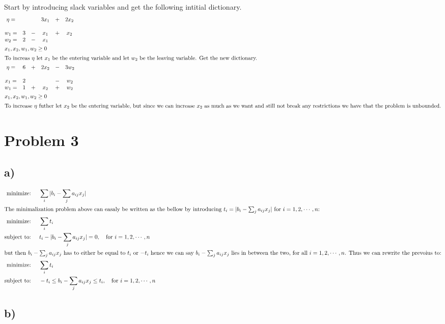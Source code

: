 \documentclass{article}
\begin{document}
Start by introducing slack variables and get the following intitial dictionary.
\begin{align*}
  &\begin{matrix}
     \eta = & & & 3x_1& + &2x_2 \\
     \\
     w_1 = & 3 & - & x_1& + &x_2  \\
     w_2 = & 2 & -&x_1 & & \\
   \end{matrix} \\
  &x_1, x_2, w_1, w_2 \geq 0 \\
  \intertext{To increas $\eta$ let $x_1$ be the entering variable and let $w_2$ be the leaving variable. Get the new dictionary.}
  &\begin{matrix}
     \eta = &6 & + & 2x_2& - &3w_2 \\
     \\
     x_1 = & 2 & & & -&w_2 \\
     w_1 = & 1 & + & x_2& + &w_2  \\
   \end{matrix} \\
  &x_1, x_2, w_1, w_2 \geq 0 \\
  \intertext{To increase $\eta$ futher let $x_2$ be the entering variable, but since we can increase $x_2$ as much as we want and still not break any restrictions we have that the problem is unbounded.}
\end{align*}


\section*{Problem 3}
\subsection*{a)}

\begin{align*}
  \text{minimize: \quad} &\sum_i|b_i - \sum_ja_{ij}x_j|\\
  \intertext{The minimalization problem above can easaly be written as the bellow by introducing $t_i = |b_i - \sum_ja_{ij}x_j|$ for $i = 1, 2, \cdots, n$:}
  \text{minimize: \quad} &\sum_i t_i \\
  \text{subject to: \quad} &t_i - |b_i - \sum_ja_{ij}x_j|  = 0, \text{\quad for $i = 1, 2, \cdots, n$}\\
  \intertext{but then $b_i - \sum_ja_{ij}x_j$ has to either be equal to $t_i$ or $-t_i$ hence we can say $b_i - \sum_ja_{ij}x_j$ lies in between the two, for all $i = 1, 2, \cdots, n$. Thus we can rewrite the prevoius to:}
  \text{minimize: \quad} &\sum_i t_i \\
  \text{subject to: \quad} &-t_i \leq b_i - \sum_ja_{ij}x_j \leq t_i, \text{\quad for $i = 1, 2, \cdots, n$}\\
\end{align*}

\subsection*{b)}
\end{document}
